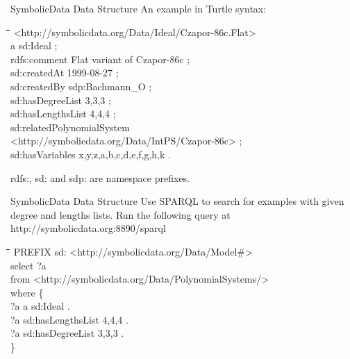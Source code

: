 \documentclass{beamer}
\newenvironment{code}{\footnotesize\tt \begin{tabbing}
\hskip12pt\=\hskip12pt\=\hskip12pt\=\hskip12pt\=\hskip5cm\=\hskip5cm\=\kill}
{\end{tabbing}}
\begin{document}
\begin{frame}{SymbolicData Data Structure}{}
An example in Turtle syntax:

\begin{code}
  <http://symbolicdata.org/Data/Ideal/Czapor-86c.Flat> \+\\
  a sd:Ideal ;\\
  rdfs:comment {\dq}Flat variant of Czapor-86c{\dq} ;\\
  sd:createdAt {\dq}1999-08-27{\dq} ;\\
  sd:createdBy sdp:Bachmann\_O ;\\
  sd:hasDegreeList {\dq}3,3,3{\dq} ;\\
  sd:hasLengthsList {\dq}4,4,4{\dq} ;\\
  sd:relatedPolynomialSystem\\\>
  <http://symbolicdata.org/Data/IntPS/Czapor-86c> ;\\
  sd:hasVariables {\dq}x,y,z,a,b,c,d,e,f,g,h,k{\dq} .
\end{code}
rdfs:, sd: and sdp: are namespace prefixes.
\end{frame}

\begin{frame}{SymbolicData Data Structure}{}
Use SPARQL to search for examples with given degree and lengths lists. Run the
following query at http://symbolicdata.org:8890/sparql

\begin{code}
  PREFIX sd: <http://symbolicdata.org/Data/Model\#>\\ 
  select ?a \\
  from <http://symbolicdata.org/Data/PolynomialSystems/>\\
  where \{\+\\
    ?a a sd:Ideal . \\
    ?a sd:hasLengthsList {\dq}4,4,4{\dq} . \\
    ?a sd:hasDegreeList {\dq}3,3,3{\dq} . \-\\
  \} 
\end{code}
\end{frame}
\end{document}
